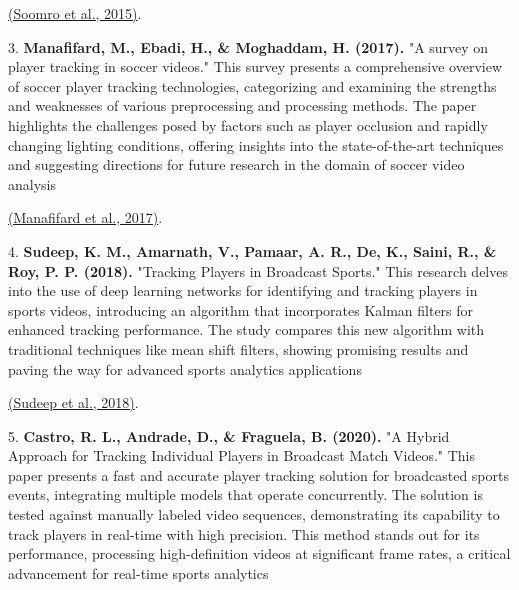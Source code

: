 \documentclass[12pt, letterpaper]{article}
\begin{document}
{\begin{spacing}{1.2}
\href{https://consensus.app/papers/tracking-when-camera-looks-away-soomro/d33a6a9f5abc50c6b99bbaaadee74e16/?utm_source=chatgpt}{(Soomro et al., 2015)}.

3. \textbf{Manafifard, M., Ebadi, H., \& Moghaddam, H. (2017).} "A survey on player tracking in soccer videos." 
This survey presents a comprehensive overview of soccer player tracking technologies, categorizing and examining the strengths and weaknesses of various preprocessing and processing methods. The paper highlights the challenges posed by factors such as player occlusion and rapidly changing lighting conditions, offering insights into the state-of-the-art techniques and suggesting directions for future research in the domain of soccer video analysis

\href{https://consensus.app/papers/survey-player-tracking-soccer-videos-manafifard/880b411648dc551d9e811bc99470c446/?utm_source=chatgpt}{(Manafifard et al., 2017)}.

4. \textbf{Sudeep, K. M., Amarnath, V., Pamaar, A. R., De, K., Saini, R., \& Roy, P. P. (2018).} "Tracking Players in Broadcast Sports." 
This research delves into the use of deep learning networks for identifying and tracking players in sports videos, introducing an algorithm that incorporates Kalman filters for enhanced tracking performance. The study compares this new algorithm with traditional techniques like mean shift filters, showing promising results and paving the way for advanced sports analytics applications 

\href{https://consensus.app/papers/tracking-players-broadcast-sports-sudeep/4fb846770e345219850e425f227cd66f/?utm_source=chatgpt}{(Sudeep et al., 2018)}.

5. \textbf{Castro, R. L., Andrade, D., \& Fraguela, B. (2020).} "A Hybrid Approach for Tracking Individual Players in Broadcast Match Videos." 
This paper presents a fast and accurate player tracking solution for broadcasted sports events, integrating multiple models that operate concurrently. The solution is tested against manually labeled video sequences, demonstrating its capability to track players in real-time with high precision. This method stands out for its performance, processing high-definition videos at significant frame rates, a critical advancement for real-time sports analytics


\end{spacing}}
\end{document}
